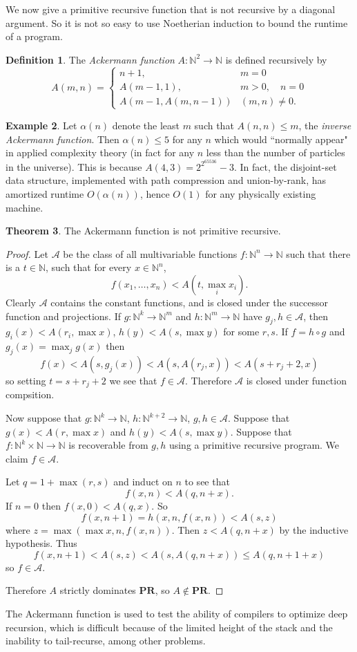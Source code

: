\documentclass[12pt]{report}
\newcommand{\NN}{\mathbb{N}}
\newcommand{\PR}{\mathbf{PR}}
\newcommand{\dfn}[1]{\emph{#1}\index{#1}}
\theoremstyle{definition}
\newtheorem{theorem}{Theorem}[chapter]
\newtheorem{definition}[theorem]{Definition}
\newtheorem{example}[theorem]{Example}
\begin{document}
We now give a primitive recursive function that is not recursive by a diagonal argument. So it is not so easy to use Noetherian induction to bound the runtime of a program.
\begin{definition}
The \dfn{Ackermann function} $A: \NN^2 \to \NN$ is defined recursively by
$$
A(m, n) = \begin{cases}
  n + 1, &m = 0\\
  A(m-1,1), &m > 0, \quad n = 0\\
  A(m-1, A(m,n-1)) &(m,n) \neq 0.
\end{cases}
$$
\end{definition}
\begin{example}
Let $\alpha(n)$ denote the least $m$ such that $A(n, n) \leq m$, the \dfn{inverse Ackermann function}. Then $\alpha(n) \leq 5$ for any $n$ which would ``normally appear" in applied complexity theory (in fact for any $n$ less than the number of particles in the universe). This is because $A(4, 3) = 2^{2^{65536}} - 3$. In fact, the disjoint-set data structure, implemented with path compression and union-by-rank, has amortized runtime $O(\alpha(n))$, hence $O(1)$ for any physically existing machine.
\end{example}

\begin{theorem}
The Ackermann function is not primitive recursive.
\end{theorem}
\begin{proof}
Let $\mathcal A$ be the class of all multivariable functions $f: \NN^n \to \NN$ such that there is a $t \in \NN$, such that for every $x \in \NN^n$,
$$f(x_1, \dots, x_n) < A(t, \max_i x_i).$$
Clearly $\mathcal A$ contains the constant functions, and is closed under the successor function and projections. If $g: \NN^k \to \NN^m$ and $h: \NN^m \to \NN$ have $g_j, h \in \mathcal A$, then $g_i(x) < A(r_i, \max x)$, $h(y) < A(s, \max y)$ for some $r,s$. If $f = h \circ g$ and $g_j(x) = \max_j g(x)$ then
$$f(x) < A(s, g_j(x)) < A(s, A(r_j, x)) < A(s + r_j + 2, x)$$
so setting $t = s + r_j + 2$ we see that $f \in \mathcal A$. Therefore $\mathcal A$ is closed under function compsition.

Now suppose that $g: \NN^k \to \NN$, $h: \NN^{k+2} \to \NN$, $g, h \in \mathcal A$. Suppose that $g(x) < A(r, \max x)$ and $h(y) < A(s, \max y)$. Suppose that $f: \NN^k \times \NN \to \NN$ is recoverable from $g, h$ using a primitive recursive program. We claim $f \in \mathcal A$.

Let $q = 1 + \max(r,s)$ and induct on $n$ to see that
$$f(x, n) < A(q, n + x).$$
If $n = 0$ then $f(x, 0) < A(q, x)$. So
$$f(x, n + 1) = h(x, n, f(x, n)) < A(s, z)$$
where $z = \max(\max x, n, f(x, n))$. Then $z < A(q, n +x)$ by the inductive hypothesis. Thus
$$f(x, n + 1) < A(s, z) < A(s, A(q, n + x)) \leq A(q, n + 1 + x)$$
so $f \in \mathcal A$.

Therefore $A$ strictly dominates $\PR$, so $A \notin \PR$.
\end{proof}
The Ackermann function is used to test the ability of compilers to optimize deep recursion, which is difficult because of the limited height of the stack and the inability to tail-recurse, among other problems.
\end{document}
